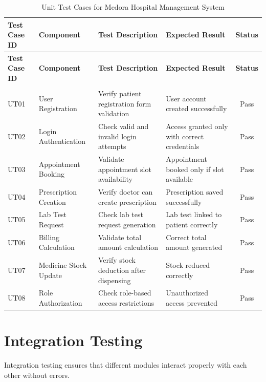 \begin{longtable}{|p{1.5cm}|p{2.5cm}|p{4cm}|p{4cm}|c|}
\hline
\textbf{Test Case ID} & \textbf{Component} & \textbf{Test Description} & \textbf{Expected Result} & \textbf{Status} \\
\hline
\endfirsthead

\hline
\textbf{Test Case ID} & \textbf{Component} & \textbf{Test Description} & \textbf{Expected Result} & \textbf{Status} \\
\hline
\endhead

\hline
\caption{Unit Test Cases for Medora Hospital Management System} \label{tab:unit_tests} \\
\endlastfoot

UT01 & User Registration & Verify patient registration form validation & User account created successfully & Pass \\
\hline
UT02 & Login Authentication & Check valid and invalid login attempts & Access granted only with correct credentials & Pass \\
\hline
UT03 & Appointment Booking & Validate appointment slot availability & Appointment booked only if slot available & Pass \\
\hline
UT04 & Prescription Creation & Verify doctor can create prescription & Prescription saved successfully & Pass \\
\hline
UT05 & Lab Test Request & Check lab test request generation & Lab test linked to patient correctly & Pass \\
\hline
UT06 & Billing Calculation & Validate total amount calculation & Correct total amount generated & Pass \\
\hline
UT07 & Medicine Stock Update & Verify stock deduction after dispensing & Stock reduced correctly & Pass \\
\hline
UT08 & Role Authorization & Check role-based access restrictions & Unauthorized access prevented & Pass \\
\end{longtable}

\newpage
\section{Integration Testing}

Integration testing ensures that different modules interact properly with each other without errors.

